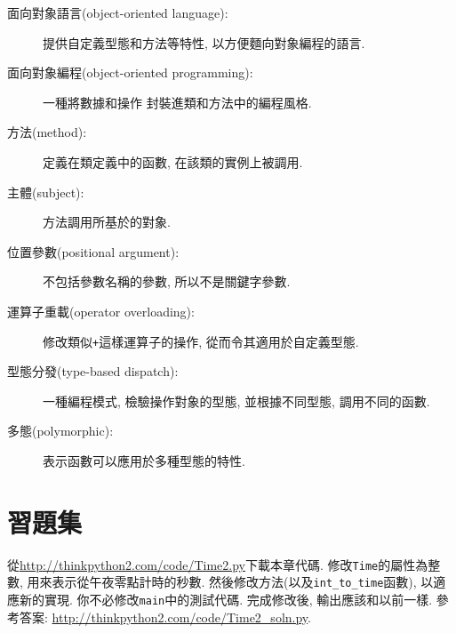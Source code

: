 \documentclass[10pt]{book}
\begin{document}
\begin{description}

\item[面向對象語言(object-oriented language):] 提供自定義型態和方法等特性, 
以方便麵向對象編程的語言. 

\item[面向對象編程(object-oriented programming):] 
一種將數據和操作
封裝進類和方法中的編程風格.

\item[方法(method):] 定義在類定義中的函數, 
在該類的實例上被調用. 

\item[主體(subject):] 方法調用所基於的對象. 

\item[位置參數(positional argument):] 不包括參數名稱的參數, 
所以不是關鍵字參數. 

\item[運算子重載(operator overloading):] 修改類似{\tt +}這樣運算子的操作, 
從而令其適用於自定義型態. 

\item[型態分發(type-based dispatch):] 一種編程模式, 檢驗操作對象的型態, 
並根據不同型態, 調用不同的函數. 

\item[多態(polymorphic):] 表示函數可以應用於多種型態的特性. 

\end{description}


\section{習題集}

\begin{exercise}

從\url{http://thinkpython2.com/code/Time2.py}下載本章代碼. 
修改{\tt Time}的屬性為整數, 用來表示從午夜零點計時的秒數. 
然後修改方法(以及\verb"int_to_time"函數), 以適應新的實現. 
你不必修改{\tt main}中的測試代碼. 
完成修改後, 輸出應該和以前一樣. 
參考答案: \url{http://thinkpython2.com/code/Time2_soln.py}.

\end{exercise}
\end{document}
